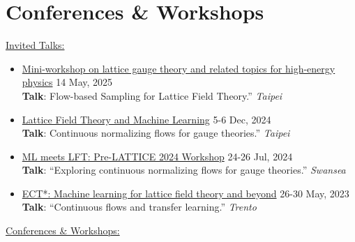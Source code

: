 \documentclass[11pt, letterpaper]{article}
\newcommand{\dateright}[1]{\hfill{\small\color{accentblue} #1}}
\begin{document}
\section*{Conferences \& Workshops}
\underline{Invited Talks:}
\begin{itemize}[left=0pt, itemsep=5pt]
    \item {\href{https://indico.phys.nthu.edu.tw/event/149/timetable/#20250514}{Mini-workshop on lattice gauge theory and related topics for high-energy physics}} \dateright{ 14 May, 2025} \\
    {\footnotesize \textbf{Talk}: Flow-based Sampling for Lattice Field Theory.”} \dateright{{\color{black}\textit{Taipei}}}

    \item {\href{https://indico.phys.sinica.edu.tw/event/133/}{Lattice Field Theory and Machine Learning}} \dateright{ 5-6 Dec, 2024} \\
    {\footnotesize \textbf{Talk}: Continuous normalizing flows for gauge theories.”} \dateright{{\color{black}\textit{Taipei}}}

    \item {\href{http://pyweb.swan.ac.uk/~aarts/ml-lft-2024-programme.html}{ML meets LFT: Pre-LATTICE 2024 Workshop}} \dateright{ 24-26 Jul, 2024} \\
    {\footnotesize \textbf{Talk}: “Exploring continuous normalizing flows for gauge theories.”} \dateright{{\color{black}\textit{Swansea}}}

    \item {\href{https://indico.ectstar.eu/event/171/contributions/3849/}{ECT*: Machine learning for lattice field theory and beyond}} \dateright{ 26-30 May, 2023} \\
    {\footnotesize \textbf{Talk}: “Continuous flows and transfer learning.”} \dateright{{\color{black}\textit{Trento}}}

\end{itemize}

\underline{Conferences \& Workshops:}
\end{document}
